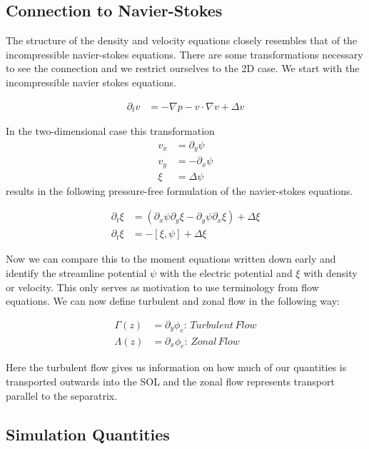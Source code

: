 \subsection{Connection to Navier-Stokes}
\label{sec:connection_navier_stokes}

The structure of the density and velocity equations closely resembles that of the incompressible navier-stokes equations.
There are some transformations necessary to see the connection and we restrict ourselves to the 2D case. We start with the incompressible navier stokes equations.

\begin{align}
    \partial_t v &= - \nabla p - v \cdot \nabla v + \Delta v
\end{align}

In the two-dimensional case this transformation
\begin{align}
    v_x &= \partial_y \psi \\
    v_y &= -\partial_x \psi \\
    \xi &= \Delta \psi
\end{align}
results in the following pressure-free formulation of the navier-stokes equations.

\begin{align}
    \partial_t \xi &= \left( \partial_x \psi \partial_y \xi - \partial_y \psi \partial_x \xi  \right) + \Delta \xi\\
    \partial_t \xi &= - \left[\xi, \psi\right] + \Delta \xi
\end{align}

Now we can compare this to the moment equations written down early and identify the streamline potential $\psi$ with the electric potential and $\xi$ with density or velocity. This only serves as motivation to use terminology from flow equations. We can now define turbulent and zonal flow in the following way:

\begin{align}
    \Gamma(z) &= \partial_y \phi_e :\, Turbulent\,Flow\\
    \Lambda(z) &= \partial_x \phi_e :\, Zonal\,Flow
\end{align}

Here the turbulent flow gives us information on how much of our quantities is transported outwards into the SOL and the zonal flow represents transport parallel to the separatrix.

\subsection{Simulation Quantities}

